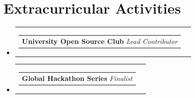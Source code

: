 \documentclass[a4paper,11pt]{article}
\makeatletter
\newcommand{\resumeProjectHeading}[2]{
    \vspace{-1pt}\item
    \begin{tabular*}{0.97\textwidth}[t]{l@{\extracolsep{\fill}}r}
      \begin{tabular}[t]{@{}l@{}}#1\end{tabular} & \textit{#2} \\
    \end{tabular*}\vspace{-5pt}
}
\newcommand{\resumeSubHeadingListStart}{\begin{itemize}[leftmargin=0.15in, label={}]}
\newcommand{\resumeSubHeadingListEnd}{\end{itemize}}
\makeatother
\begin{document}
\section{Extracurricular Activities}
  \resumeSubHeadingListStart
   
    \resumeProjectHeading
      {\textbf{University Open Source Club} $|$ \emph{Lead Contributor}}{}
      
    \resumeProjectHeading
      {\textbf{Global Hackathon Series} $|$ \emph{Finalist}}{}
      
  \resumeSubHeadingListEnd
\end{document}
